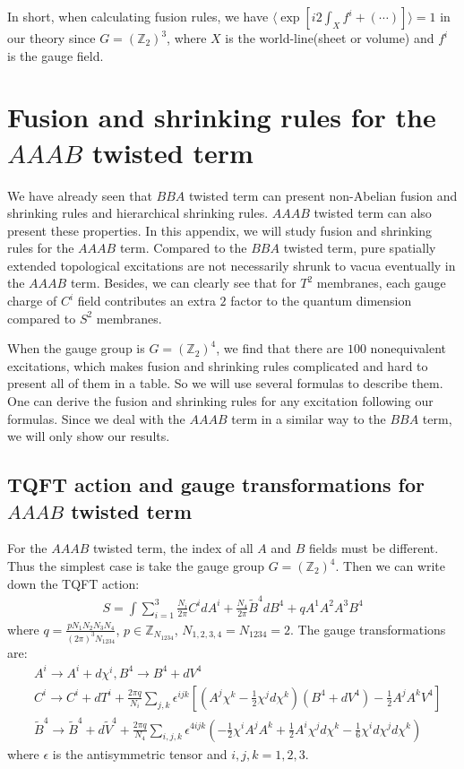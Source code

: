 \documentclass[11pt,nofootinbib,preprint]{revtex4-1}
\begin{document}
In short, when calculating fusion rules, we have $\langle \exp \left[ i2\int_{X}{f^i+\left( \cdots \right)} \right] \rangle =1$ in our theory since $G=\left( \mathbb{Z} _2 \right) ^3$, where $X$ is the world-line(sheet or volume) and $f^i$ is the gauge field. 
\section{Fusion and shrinking rules for the $AAAB$ twisted term\label{ap4}}
We have already seen that $BBA$ twisted term can present non-Abelian fusion and shrinking rules and hierarchical shrinking rules. $AAAB$ twisted term can also present these properties. In this appendix, we will study fusion and shrinking rules for the $AAAB$ term. Compared to the $BBA$ twisted term, pure spatially extended topological excitations are not necessarily shrunk to vacua eventually in the $AAAB$ term. Besides, we can clearly see that for $T^2$ membranes, each gauge charge of $C^i$ field contributes an extra $2$ factor to the quantum dimension compared to $S^2$ membranes.

When the gauge group is $G={\left( \mathbb{Z} _{2} \right)}^4$, we find that there are $100$ nonequivalent excitations, which makes fusion and shrinking rules complicated and hard to present all of them in a table. So we will use several formulas to describe them. One can derive the fusion and shrinking rules for any excitation following our formulas. Since we deal with the $AAAB$ term in a similar way to the $BBA$ term, we will only show our results. 
\subsection{TQFT action and gauge transformations for $AAAB$ twisted term}
For the $AAAB$ twisted term, the index of all $A$ and $B$ fields must be different. Thus the simplest case is take the gauge group $G={\left( \mathbb{Z} _{2} \right)}^4$. Then we can write down the TQFT action:
\begin{align}
	S=\int{\sum_{i=1}^3{\frac{N_i}{2\pi}C^idA^i}+}\frac{N_4}{2\pi}\tilde{B}^4dB^4+qA^1A^2A^3B^4
\end{align}
where $q=\frac{pN_1N_2N_3N_4}{\left( 2\pi \right) ^3N_{1234}}$, $p\in \mathbb{Z} _{N_{1234}}$, $N_{1,2,3,4}=N_{1234}=2$. The gauge transformations are:
\begin{align}
	&A^i\rightarrow A^i+d\chi ^i,B^4\rightarrow B^4+dV^4
	\label{eq21}
	\\
	&C^i\rightarrow C^i+dT^i+\frac{2\pi q}{N_i}\sum_{j,k}{\epsilon ^{ijk}}\left[ \left( A^j\chi ^k-\frac{1}{2}\chi ^jd\chi ^k \right) \left( B^4+dV^4 \right) -\frac{1}{2}A^jA^kV^4 \right] 
	\\
	&\tilde{B}^4\rightarrow \tilde{B}^4+d\tilde{V}^4+\frac{2\pi q}{N_4}\sum_{i,j,k}{\epsilon ^{4ijk}}\left( -\frac{1}{2}\chi ^iA^jA^k+\frac{1}{2}A^i\chi ^jd\chi ^k-\frac{1}{6}\chi ^id\chi ^jd\chi ^k \right) 
\end{align}
where $\epsilon$ is the antisymmetric tensor and $i,j,k=1,2,3$.
\end{document}
